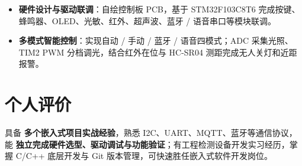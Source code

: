 \documentclass[10pt,a4paper]{article}
\begin{document}
\begin{itemize}[leftmargin=1.5em, itemsep=2pt, parsep=0pt, topsep=2pt]
    \item \textbf{硬件设计与驱动联调}：自绘控制板 PCB，基于 STM32F103C8T6 完成按键、蜂鸣器、OLED、光敏、红外、超声波、蓝牙 / 语音串口等模块联调。
    \item \textbf{多模式智能控制}：实现自动 / 手动 / 蓝牙 / 语音四模式；ADC 采集光照、TIM2 PWM 分档调光，结合红外在位与 HC-SR04 测距完成无人关灯和近距报警。
\end{itemize}

\vspace{0.1em}

\section{\faUser\hspace{0.4em}个人评价}

具备 \textbf{多个嵌入式项目实战经验}，熟悉 I2C、UART、MQTT、蓝牙等通信协议，能 \textbf{独立完成硬件选型、驱动调试与功能验证}；有工程检测设备开发实习经历，掌握 C/C++ 底层开发与 Git 版本管理，可快速胜任嵌入式软件开发岗位。
\end{document}
